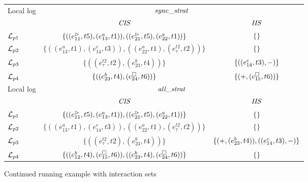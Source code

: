 \begin{figure}
    \centering
    \begin{tabular}{|l|c|c|}
    \hline
    \multirow{2}{*}{Local log} & \multicolumn{2}{|c|}{$\mathit{sync\_strat}$}  \\
     & $\mathit{CIS}$ & $\mathit{IIS}$ \\
    \hline
    $\mathcal{L}_{p1}$ 
    & $\{ ((e_{11}^\rhd,t5),(e_{13}^a,t1)), ((e_{21}^\rhd,t5), (e_{22}^a,t1)) \}$ & $\{\}$ 
     \\
    $\mathcal{L}_{p2}$ 
    & $\{ ((e_{13}^a,t1), (e_{14}^c,t3)), ((e_{22}^a,t1),(e_{\tau}^{t2},t2)) \}$ & $\{\}$ 
     \\
    $\mathcal{L}_{p3}$ 
    & $\{ ((e_{\tau}^{t2},t2),(e_{23}^b, t4)) \}$ & $\{ ((e_{14}^c,t3),-) \}$ 
     \\
    $\mathcal{L}_{p4}$ 
    & $\{ ((e_{23}^b,t4),(e_{24}^\square,t6)) \}$ & $\{ (+,(e_{15}^\square,t6)) \}$
     \\
    \hline
    \hline
    \multirow{2}{*}{Local log} & \multicolumn{2}{|c|}{$\mathit{all\_strat}$} \\
    & $\mathit{CIS}$ & $\mathit{IIS}$ \\
    \hline
    $\mathcal{L}_{p1}$ & $\{ ((e_{11}^\rhd,t5),(e_{13}^a,t1)), ((e_{21}^\rhd,t5), (e_{22}^a,t1)) \}$ & $\{\}$ \\
    $\mathcal{L}_{p2}$ & $\{ ((e_{13}^a,t1), (e_{14}^c,t3)), ((e_{22}^a,t1),(e_{\tau}^{t2},t2)) \}$ & $\{\}$ \\
    $\mathcal{L}_{p3}$ & $\{ ((e_{\tau}^{t2},t2),(e_{23}^b, t4)) \}$ & $\{ (+,(e_{23}^b,t4)), ((e_{14}^c, t3),-) \}$ \\
    $\mathcal{L}_{p4}$ & $\{ ((e_{12}^b,t4), (e_{15}^\square,t6)), ((e_{23}^b,t4),(e_{24}^\square,t6)) \}$ & $\{\}$ \\
    \hline
    \end{tabular}
    \caption{Continued running example with interaction sets}
    \label{fig:interactionstrats}
\end{figure}

